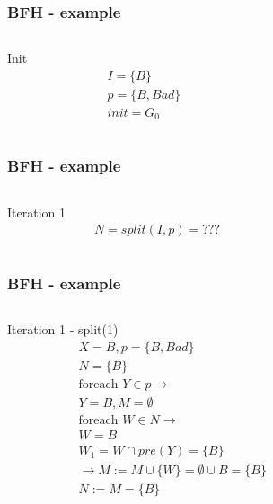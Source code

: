 \documentclass[11pt,handout]{beamer}
\begin{document}
\begin{frame}
  \frametitle{BFH - example}
  \begin{columns}
    \begin{column}{0.5\textwidth}
      Init
      \begin{align*}
        & I = \{ B \} \\
        & p = \{ B, Bad \} \\
        & init = G_0
      \end{align*}
    \end{column}
    \begin{column}{0.5\textwidth}%
      
    \end{column}
  \end{columns}
\end{frame}

\begin{frame}
  \frametitle{BFH - example}
  \begin{columns}
    \begin{column}{0.5\textwidth}
      Iteration 1
      \begin{align*}
        & N = split(I,p) = ???
      \end{align*}
    \end{column}
    \begin{column}{0.5\textwidth}%
      
    \end{column}
  \end{columns}
\end{frame}

\begin{frame}
  \frametitle{BFH - example}
  \begin{columns}
    \begin{column}{0.5\textwidth}
      Iteration 1 - split(1)
      \begin{align*}
        & X = B , p = \{B, Bad\} \\
        & N = \{B\}\\
        & \text{foreach $Y \in p$} \to \\
        & Y = B , M = \emptyset \\
        & \text{foreach $W \in N$} \to \\
        & W = B \\
        & W_1 = W \cap pre(Y) = \{ B \} \\
        & \to M := M \cup \{W\} = \emptyset \cup B = \{B\} \\
        & N := M = \{B\}
      \end{align*}
    \end{column}
    \begin{column}{0.5\textwidth}%
      
    \end{column}
  \end{columns}
\end{frame}
\end{document}
